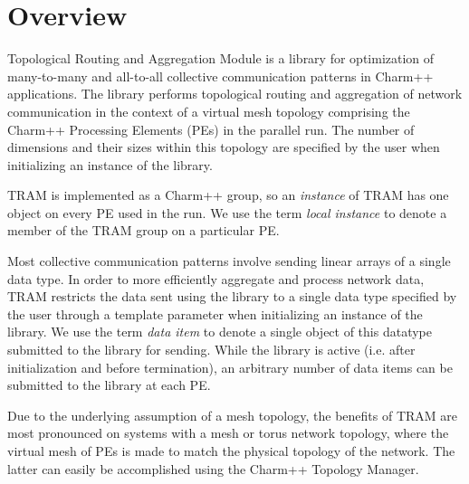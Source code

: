 
%



\section{Overview}

Topological Routing and Aggregation Module is a library for optimization of
many-to-many and all-to-all collective communication patterns in Charm++
applications. The library performs topological routing and aggregation of
network communication in the context of a virtual mesh topology comprising the
Charm++ Processing Elements (PEs) in the parallel run. The number of dimensions
and their sizes within this topology are specified by the user when initializing
an instance of the library.

TRAM is implemented as a Charm++ group, so an \emph{instance}
of TRAM has one object on every PE used in the run. We use
the term \emph{local instance} to denote a member of the TRAM
group on a particular PE.

Most collective communication patterns involve sending linear arrays
of a single data type. In order to more efficiently aggregate and
process network data, TRAM restricts the data sent using the
library to a single data type specified by the user through a template
parameter when initializing an instance of the library. We use the
term \emph{data item} to denote a single object of this datatype
submitted to the library for sending. While the library is active
(i.e. after initialization and before termination), an arbitrary
number of data items can be submitted to the library at each PE.

Due to the underlying assumption of a mesh topology, the
benefits of TRAM are most pronounced on systems with a mesh
or torus network topology, where the virtual mesh of PEs is made to
match the physical topology of the network. The latter can easily be
accomplished using the Charm++ Topology Manager.

